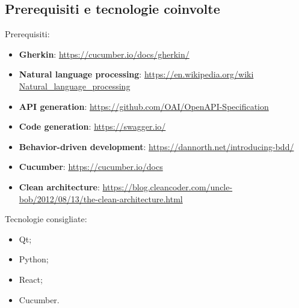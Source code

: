 \subsection{Prerequisiti e tecnologie coinvolte}
Prerequisiti:
\begin{itemize}
\item \textbf{Gherkin}: \url{https://cucumber.io/docs/gherkin/}
\item \textbf{Natural language processing}: \url{https://en.wikipedia.org/wiki Natural_language_processing}
\item \textbf{API generation}: \url{https://github.com/OAI/OpenAPI-Specification}
\item \textbf{Code generation}: \url{https://swagger.io/}
\item \textbf{Behavior-driven development}: \url{https://dannorth.net/introducing-bdd/}
\item \textbf{Cucumber}: \url{https://cucumber.io/docs}
\item \textbf{Clean architecture}: \url{https://blog.cleancoder.com/uncle-bob/2012/08/13/the-clean-architecture.html}
\end{itemize}
Tecnologie consigliate:
\begin{itemize}
\item Qt;
\item Python;
\item React;
\item Cucumber.
\end{itemize}

